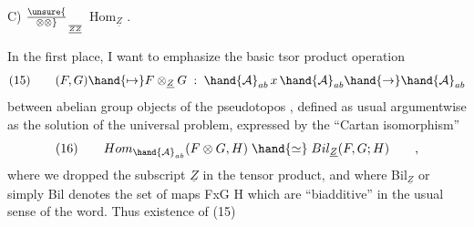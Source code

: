C) \quad {} $\unsure{\over{\otimes}{\otimes}}_{\over{\underline{Z}}{\underline{Z}}}$ \hand{\uline{\textcolor{black}{and}}} Hom$_{\underline{Z}}$ .

In the first place, I want to emphasize the basic tsor product
operation
\[ (15) \qquad (F,G) \hand{\mapsto} F\otimes_{\underline{Z}}G \; : \; \hand{\mathcal{A}}_{ab} \, x \, \hand{\mathcal{A}}_{ab} \hand{\rightarrow} \hand{\mathcal{A}}_{ab} \]
between abelian group objects of the pseudotopos , defined as usual
argumentwise as the solution of the universal problem, expressed by the
``Cartan isomorphism''
\[ (16) \qquad Hom_{\hand{\mathcal{A}}_{ab}}(F\otimes G,H) \; \hand{\simeq} \; Bil_{\underline{Z}}(F,G;H) \qquad , \]
where we dropped the subscript $\underline{Z}$ in the tensor product, and where
Bil$_{\underline{Z}}$ or simply Bil denotes the set of maps FxG \hand{$\longrightarrow$} H which are
``biadditive'' in the usual sense of the word. Thus existence of (15)

